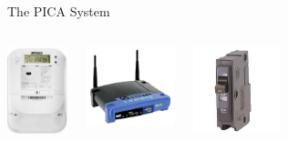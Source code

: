\documentclass{beamer}
\begin{document}
\begin{frame}{The PICA System}

\pause
\begin{columns}[t]
		\begin{center}
		\includegraphics[height=1in]{includes/europe_smart_meter}\\
		\end{center}\pause
		\begin{center}
		\includegraphics[width=1in]{includes/wrt54g}\\
		\end{center}\pause
		\begin{center}
		\includegraphics[width=1in]{includes/reset-circuit-breaker}\\
		\end{center}
\end{columns}
\end{frame}
\end{document}
